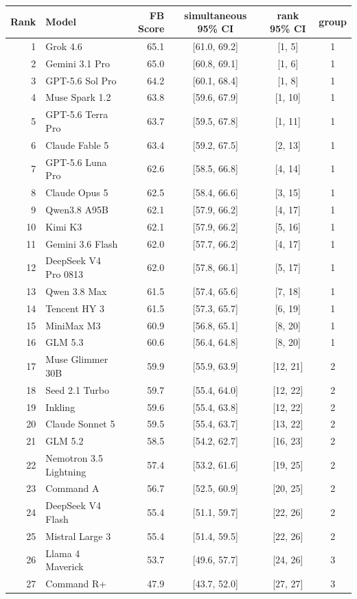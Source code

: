 \begin{tabular}{@{}r l r c c c@{}}
\toprule
Rank & Model & FB Score & simultaneous 95\% CI & rank 95\% CI & group \\
\midrule
1 & Grok 4.6 & 65.1 & [61.0, 69.2] & [1, 5] & 1 \\
2 & Gemini 3.1 Pro & 65.0 & [60.8, 69.1] & [1, 6] & 1 \\
3 & GPT-5.6 Sol Pro & 64.2 & [60.1, 68.4] & [1, 8] & 1 \\
4 & Muse Spark 1.2 & 63.8 & [59.6, 67.9] & [1, 10] & 1 \\
5 & GPT-5.6 Terra Pro & 63.7 & [59.5, 67.8] & [1, 11] & 1 \\
6 & Claude Fable 5 & 63.4 & [59.2, 67.5] & [2, 13] & 1 \\
7 & GPT-5.6 Luna Pro & 62.6 & [58.5, 66.8] & [4, 14] & 1 \\
8 & Claude Opus 5 & 62.5 & [58.4, 66.6] & [3, 15] & 1 \\
9 & Qwen3.8 A95B & 62.1 & [57.9, 66.2] & [4, 17] & 1 \\
10 & Kimi K3 & 62.1 & [57.9, 66.2] & [5, 16] & 1 \\
11 & Gemini 3.6 Flash & 62.0 & [57.7, 66.2] & [4, 17] & 1 \\
12 & DeepSeek V4 Pro 0813 & 62.0 & [57.8, 66.1] & [5, 17] & 1 \\
13 & Qwen 3.8 Max & 61.5 & [57.4, 65.6] & [7, 18] & 1 \\
14 & Tencent HY 3 & 61.5 & [57.3, 65.7] & [6, 19] & 1 \\
15 & MiniMax M3 & 60.9 & [56.8, 65.1] & [8, 20] & 1 \\
16 & GLM 5.3 & 60.6 & [56.4, 64.8] & [8, 20] & 1 \\
17 & Muse Glimmer 30B & 59.9 & [55.9, 63.9] & [12, 21] & 2 \\
18 & Seed 2.1 Turbo & 59.7 & [55.4, 64.0] & [12, 22] & 2 \\
19 & Inkling & 59.6 & [55.4, 63.8] & [12, 22] & 2 \\
20 & Claude Sonnet 5 & 59.5 & [55.4, 63.7] & [13, 22] & 2 \\
21 & GLM 5.2 & 58.5 & [54.2, 62.7] & [16, 23] & 2 \\
22 & Nemotron 3.5 Lightning & 57.4 & [53.2, 61.6] & [19, 25] & 2 \\
23 & Command A & 56.7 & [52.5, 60.9] & [20, 25] & 2 \\
24 & DeepSeek V4 Flash & 55.4 & [51.1, 59.7] & [22, 26] & 2 \\
25 & Mistral Large 3 & 55.4 & [51.4, 59.5] & [22, 26] & 2 \\
26 & Llama 4 Maverick & 53.7 & [49.6, 57.7] & [24, 26] & 3 \\
27 & Command R+ & 47.9 & [43.7, 52.0] & [27, 27] & 3 \\
\bottomrule
\end{tabular}
